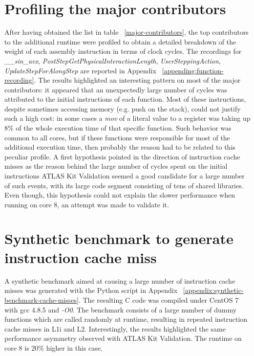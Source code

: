 \documentclass[a4paper]{jpconf}
\begin{document}
\section{Profiling the major contributors}
After having obtained the list in table ~\ref{major-contributors}, the 
top contributors to the additional runtime were profiled to obtain
a detailed breakdown of the weight of each assembly instruction in terms of 
clock cycles. The recordings for \textit{\_\_sin\_avx}, 
\textit{PostStepGetPhysicalInteractionLength}, \textit{UserSteppingAction},
\textit{UpdateStepForAlongStep} are reported in Appendix  
~\ref{appending:function-recording}. The results highlighted an interesting 
pattern on most of the major contributors:  it appeared that an unexpectedly 
large number of cycles was attributed to the initial instructions of each function.
Most of these instructions, despite sometimes accessing memory 
(e.g. push on the stack), could not justify such a high cost: in some cases a 
\textit{mov} of a literal value to a register was taking up 8\% of the whole 
execution time of that specific function. Such behavior was common to all cores,
but if these functions were responsible for most of the additional execution time,
then probably the reason had to be related to this peculiar profile. A first hypothesis
pointed in the direction of instruction cache misses as the reason behind
the large number of cycles spent on the initial instructions 
ATLAS Kit Validation seemed a good candidate for a large number of  such events,
with its large code segment consisting of tens of shared libraries. Even though,
this hypothesis could not explain the slower performance when running on core 8,
an attempt was made to validate it.
 

\section{Synthetic benchmark to generate instruction cache miss}
A synthetic benchmark aimed at causing a large number of instruction cache 
misses was generated with the Python script in Appendix 
~\ref{appendix:synthetic-benchmark-cache-misses}. The resulting C code was compiled
under CentOS 7 with gcc 4.8.5 and \textit{-O0}. The benchmark consists of a large
number of dummy functions which are called randomly at runtime, resulting in
repeated instruction cache misses in L1i and L2. Interestingly, the results
highlighted the same performance asymmetry observed with ATLAS Kit Validation.
The runtime on core 8 is 20\% higher in this case.
\end{document}
